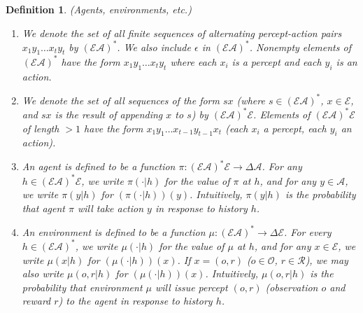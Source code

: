\documentclass[twoside]{article}
\newtheorem{definition}[theorem]{Definition}
\begin{document}
\begin{definition}
\label{omnibusdefn}
    (Agents, environments, etc.)
    \begin{enumerate}
        \item
        We denote the set of all finite sequences
        of alternating percept-action pairs $x_1y_1\ldots x_ty_t$
        by $(\mathcal E\mathcal A)^*$.
        We also include $\epsilon$ in $(\mathcal E\mathcal A)^*$.
        Nonempty elements of $(\mathcal E\mathcal A)^*$ have the
        form $x_1y_1\ldots x_ty_t$ where each $x_i$ is a percept and
        each $y_i$ is an action.
        \item
        We denote the set of all sequences of the form $sx$ (where
        $s\in (\mathcal E\mathcal A)^*$, $x\in\mathcal E$, and $sx$
        is the result of appending $x$ to $s$) by
        $(\mathcal E\mathcal A)^*\mathcal E$.
        Elements of $(\mathcal E\mathcal A)^* \mathcal E$
        of length $>1$ have the form
        $x_1y_1\ldots x_{t-1}y_{t-1}x_t$
        (each $x_i$ a percept, each $y_i$ an action).
        \item
        An \emph{agent} is defined to be a function
        $\pi:(\mathcal E\mathcal A)^*\mathcal E\to \Delta \mathcal A$.
        For any $h\in (\mathcal E\mathcal A)^*\mathcal E$,
        we write $\pi(\cdot|h)$ for the value of $\pi$ at $h$, and
        for any $y\in \mathcal A$, we write $\pi(y|h)$ for
        $(\pi(\cdot|h))(y)$.
        Intuitively, $\pi(y|h)$ is the probability that agent $\pi$
        will take action $y$ in response to history $h$.
        \item
        An \emph{environment} is defined to be a function
        $\mu:(\mathcal E\mathcal A)^*\to\Delta\mathcal E$.
        For every $h\in(\mathcal E\mathcal A)^*$, we write
        $\mu(\cdot|h)$ for the value of $\mu$ at $h$, and for any
        $x\in\mathcal E$, we write $\mu(x|h)$ for $(\mu(\cdot|h))(x)$.
        If $x=(o,r)$ ($o\in\mathcal O$, $r\in\mathcal R$), we may also
        write $\mu(o,r|h)$ for $(\mu(\cdot|h))(x)$.
        Intuitively, $\mu(o,r|h)$ is the probability that environment
        $\mu$ will issue percept $(o,r)$ (observation $o$ and reward $r$)
        to the agent in response to history $h$.
    \end{enumerate}
\end{definition}
\end{document}
